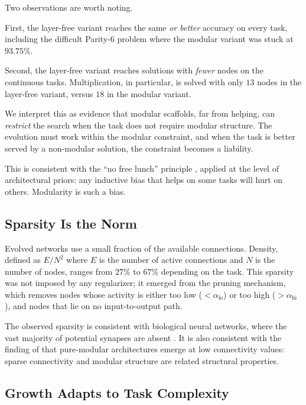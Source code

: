 Two observations are worth noting.

First, the layer-free variant reaches the same \emph{or better} accuracy
on every task, including the difficult Parity-6 problem where the
modular variant was stuck at $93.75\%$.

Second, the layer-free variant reaches solutions with \emph{fewer}
nodes on the continuous tasks. Multiplication, in particular, is solved
with only $13$ nodes in the layer-free variant, versus $18$ in the
modular variant.

We interpret this as evidence that modular scaffolds, far from helping,
can \emph{restrict} the search when the task does not require modular
structure. The evolution must work within the modular constraint, and
when the task is better served by a non-modular solution, the constraint
becomes a liability.

This is consistent with the ``no free lunch'' principle
\citep{wolpert1997no}, applied at the level of architectural priors: any
inductive bias that helps on some tasks will hurt on others. Modularity
is such a bias.

\subsection{Sparsity Is the Norm}
\label{sec:disc-sparsity}

Evolved networks use a small fraction of the available connections.
Density, defined as $E / N^2$ where $E$ is the number of active
connections and $N$ is the number of nodes, ranges from $27\%$ to
$67\%$ depending on the task. This sparsity was not imposed by any
regularizer; it emerged from the pruning mechanism, which removes nodes
whose activity is either too low ($< \alpha_{\text{lo}}$) or too high
($> \alpha_{\text{hi}}$), and nodes that lie on no input-to-output path.

The observed sparsity is consistent with biological neural networks,
where the vast majority of potential synapses are absent
\citep{chklovskii2004wiring, cherniak1994component}. It is also
consistent with the finding of \citet{landassuri2012evolution} that
pure-modular architectures emerge at low connectivity values: sparse
connectivity and modular structure are related structural properties.

\subsection{Growth Adapts to Task Complexity}
\label{sec:disc-growth}

